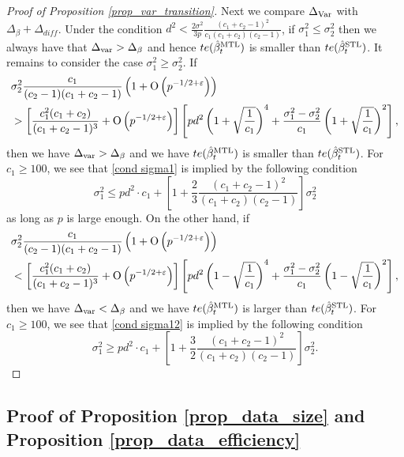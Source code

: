 \begin{proof}[Proof of Proposition \ref{prop_var_transition}]
Next we compare $\Delta_{\operatorname{Var}}$ with $\Delta_\beta + \Delta_{diff}$. Under the condition $d^2 < \frac {2\sigma^2} {3p} \frac{(c_1 + c_2 -1)^2}{c_1 (c_1 + c_2)(c_2 - 1)}$, if $\sigma_1^2\le \sigma_2^2$ then we always have that $\Delta_{\text{var}} > \Delta_{\beta}$ and hence $te(\hat{\beta}_t^{\text{MTL}})$ is smaller than $te(\hat{\beta}_t^{\text{STL}})$. It remains to consider the case $\sigma_1^2 \ge \sigma_2^2$. If 
\begin{align} 
&\sigma_2^2  \frac{c_1}{(c_2-1)(c_1 + c_2 -1)}\left(1 + \operatorname{O}\left(p^{-1/2 + \varepsilon}\right)\right) \label{cond sigma1}\\
&> \left[\frac{c_1^2 (c_1+c_2)}{(c_1+c_2-1)^3} + \operatorname{O}\left(p^{-1/2 + \varepsilon}\right)\right]\left[pd^2 \left({1 + \sqrt{\frac{1}{c_1}}}\right)^4 + \frac{\sigma_1^2-\sigma_2^2}{c_1} \left({1 + \sqrt{\frac{1}{c_1}}}\right)^2\right] ,\nonumber
\end{align}
then we have $\Delta_{\text{var}} > \Delta_{\beta}$ and we have $te(\hat{\beta}_t^{\text{MTL}})$ is smaller than $te(\hat{\beta}_t^{\text{STL}})$. For $c_1\ge 100$, we see that \eqref{cond sigma1} is implied by the following condition
$$\sigma_1^2 \le pd^2 \cdot c_1 + \left[ 1+ \frac23\frac{(c_1 + c_2 - 1)^2}{(c_1 + c_2) (c_2 - 1)} \right]\sigma_2^2$$
as long as $p$ is large enough. On the other hand, if 
\begin{align} 
&\sigma_2^2  \frac{c_1}{(c_2-1)(c_1 + c_2 -1)}\left(1 + \operatorname{O}\left(p^{-1/2 + \varepsilon}\right)\right) \label{cond sigma12}\\
&< \left[\frac{c_1^2 (c_1+c_2)}{(c_1+c_2-1)^3} + \operatorname{O}\left(p^{-1/2 + \varepsilon}\right)\right]\left[pd^2 \left({1 - \sqrt{\frac{1}{c_1}}}\right)^4 + \frac{\sigma_1^2-\sigma_2^2}{c_1} \left({1 - \sqrt{\frac{1}{c_1}}}\right)^2\right] ,\nonumber
\end{align}
then we have $\Delta_{\text{var}} < \Delta_{\beta}$ and we have $te(\hat{\beta}_t^{\text{MTL}})$ is larger than $te(\hat{\beta}_t^{\text{STL}})$. For $c_1\ge 100$, we see that \eqref{cond sigma12} is implied by the following condition
$$\sigma_1^2 \ge  pd^2 \cdot c_1 + \left[ 1+ \frac32\frac{(c_1 + c_2 - 1)^2}{(c_1 + c_2) (c_2 - 1)} \right]\sigma_2^2.$$
\end{proof}





\subsection{Proof of Proposition \ref{prop_data_size} and Proposition \ref{prop_data_efficiency}}\label{app_proof_data}

